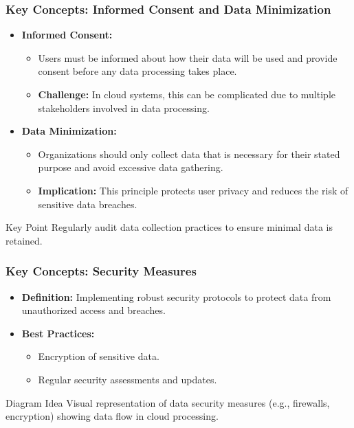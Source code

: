 \documentclass[aspectratio=169]{beamer}
\begin{document}
\begin{frame}[fragile]
    \frametitle{Key Concepts: Informed Consent and Data Minimization}
    \begin{itemize}
        \item \textbf{Informed Consent:}
            \begin{itemize}
                \item Users must be informed about how their data will be used and provide consent before any data processing takes place.
                \item \textbf{Challenge:} In cloud systems, this can be complicated due to multiple stakeholders involved in data processing.
            \end{itemize}
            
        \item \textbf{Data Minimization:}
            \begin{itemize}
                \item Organizations should only collect data that is necessary for their stated purpose and avoid excessive data gathering.
                \item \textbf{Implication:} This principle protects user privacy and reduces the risk of sensitive data breaches.
            \end{itemize}
    \end{itemize}

    \begin{block}{Key Point}
        Regularly audit data collection practices to ensure minimal data is retained.
    \end{block}
\end{frame}

\begin{frame}[fragile]
    \frametitle{Key Concepts: Security Measures}
    \begin{itemize}
        \item \textbf{Definition:} Implementing robust security protocols to protect data from unauthorized access and breaches.
        \item \textbf{Best Practices:}
            \begin{itemize}
                \item Encryption of sensitive data.
                \item Regular security assessments and updates.
            \end{itemize}
    \end{itemize}

    \begin{block}{Diagram Idea}
        Visual representation of data security measures (e.g., firewalls, encryption) showing data flow in cloud processing.
    \end{block}
\end{frame}
\end{document}
